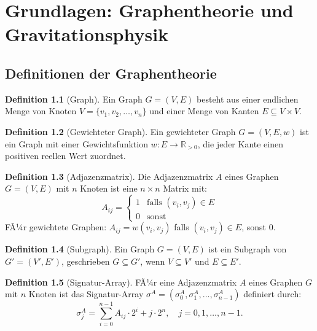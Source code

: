 ﻿\documentclass[a4paper,12pt]{report}
\theoremstyle{definition}
\newtheorem{definition}{Definition}
\begin{document}
\chapter{Grundlagen: Graphentheorie und Gravitationsphysik}

\section{Definitionen der Graphentheorie}

\begin{definition}[Graph]
Ein Graph $G = (V, E)$ besteht aus einer endlichen Menge von Knoten $V = \{v_1, v_2, \ldots, v_n\}$ und einer Menge von Kanten $E \subseteq V \times V$.
\end{definition}

\begin{definition}[Gewichteter Graph]
Ein gewichteter Graph $G = (V, E, w)$ ist ein Graph mit einer Gewichtsfunktion $w: E \to \mathbb{R}_{>0}$, die jeder Kante einen positiven reellen Wert zuordnet.
\end{definition}

\begin{definition}[Adjazenzmatrix]
Die Adjazenzmatrix $A$ eines Graphen $G = (V, E)$ mit $n$ Knoten ist eine $n \times n$ Matrix mit:
\[
A_{ij} = \begin{cases}
    1 & \text{falls } (v_i, v_j) \in E \\
    0 & \text{sonst}
\end{cases}
\]
FÃ¼r gewichtete Graphen: $A_{ij} = w(v_i, v_j)$ falls $(v_i, v_j) \in E$, sonst $0$.
\end{definition}

\begin{definition}[Subgraph]
Ein Graph $G = (V, E)$ ist ein Subgraph von $G' = (V', E')$, geschrieben $G \subseteq G'$, wenn $V \subseteq V'$ und $E \subseteq E'$.
\end{definition}

\begin{definition}[Signatur-Array]
FÃ¼r eine Adjazenzmatrix $A$ eines Graphen $G$ mit $n$ Knoten ist das Signatur-Array $\sigma^A = (\sigma^A_0, \sigma^A_1, \ldots, \sigma^A_{n-1})$ definiert durch:
\[
\sigma^A_j = \sum_{i=0}^{n-1} A_{ij} \cdot 2^i + j \cdot 2^n, \quad j = 0, 1, \ldots, n-1.
\]
\end{definition}
\end{document}
